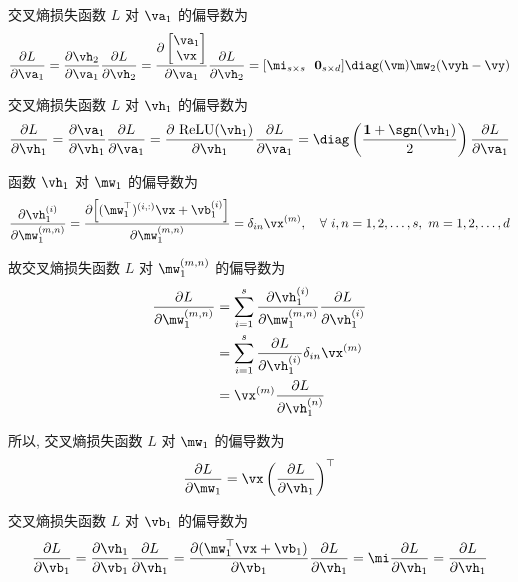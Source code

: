 \documentclass[openany]{ctexbook}
\theoremstyle{kaiti}
\theoremstyle{normal}
\begin{document}
交叉熵损失函数 $L$ 对 $\va_1$ 的偏导数为
\begin{equation}
  \frac{\partial L}{\partial \va_1}=\frac{\partial\vh_2}{\partial\va_1}\frac{\partial L}{\partial \vh_2}
  =\frac{\partial
  \begin{bmatrix}
    \va_1\\\vx\\
  \end{bmatrix}}{\partial\va_1}\frac{\partial L}{\partial \vh_2}
  =[\mi_{s\times s}~~\bm{0}_{s\times d}]
\diag(\vm)\mw_2(\vyh-\vy)
\end{equation}

交叉熵损失函数 $L$ 对 $\vh_1$ 的偏导数为
\begin{equation}
  \frac{\partial L}{\partial \vh_1}=\frac{\partial\va_1}{\partial\vh_1}\frac{\partial L}{\partial \va_1}
  =\frac{\partial~\mathrm{ReLU}(\vh_1)}{\partial\vh_1}\frac{\partial L}{\partial \va_1}
  =\diag\left(\frac{\bm{1}+\sgn(\vh_1)}{2}\right)\frac{\partial L}{\partial \va_1}
\end{equation}

函数 $\vh_1$ 对 $\mw_1$ 的偏导数为
\begin{equation}
  \frac{\partial \vh_1^{(i)}}{\partial \mw_1^{(m,n)}}=\frac{\partial \Big[(\mw_1^\top)^{(i,:)}\vx+\vb_1^{(i)}\Big]}{\partial \mw_1^{(m,n)}}=\delta_{in}\vx^{(m)},\quad\forall~i,n=1,2,\dots,s,~m=1,2,\dots,d
\end{equation}

故交叉熵损失函数 $L$ 对 $\mw_1^{(m,n)}$ 的偏导数为
\begin{equation}
  \begin{aligned}
    \frac{\partial L}{\partial \mw_1^{(m,n)}}
    &=\sum_{i=1}^s\frac{\partial \vh_1^{(i)}}{\partial\mw_1^{(m,n)}}\frac{\partial L}{\partial \vh_1^{(i)}}\\
    &=\sum_{i=1}^s\frac{\partial L}{\partial \vh_1^{(i)}}\delta_{in}\vx^{(m)}\\
    &=\vx^{(m)}\frac{\partial L}{\partial \vh_1^{(n)}}
  \end{aligned}
\end{equation}

所以, 交叉熵损失函数 $L$ 对 $\mw_1$ 的偏导数为
\begin{equation}
  \frac{\partial L}{\partial \mw_1}=\vx\left(\frac{\partial L}{\partial \vh_1}\right)^\top
\end{equation}

交叉熵损失函数 $L$ 对 $\vb_1$ 的偏导数为
\begin{equation}
  \frac{\partial L}{\partial \vb_1}=\frac{\partial\vh_1}{\partial\vb_1}\frac{\partial L}{\partial \vh_1}=\frac{\partial(\mw_1^\top\vx+\vb_1)}{\partial\vb_1}\frac{\partial L}{\partial \vh_1}=\mi\frac{\partial L}{\partial \vh_1}=\frac{\partial L}{\partial \vh_1}
\end{equation}
\end{document}
